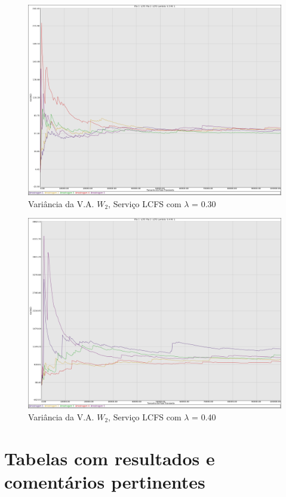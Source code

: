 \documentclass[a4paper,10pt]{article}
\begin{document}
\begin{figure}
	\caption{Variância da V.A. $W_2$, Serviço LCFS com $\lambda$ = 0.30}
	\label{figTransienteLCFSfila2VarWLambda030}
	\includegraphics[scale = 0.20]{./graficos_transiente_2/07.png}
\end{figure}

\begin{figure}
	\caption{Variância da V.A. $W_2$, Serviço LCFS com $\lambda$ = 0.40}
	\label{figTransienteLCFSfila2VarWLambda040}
	\includegraphics[scale = 0.20]{./graficos_transiente_2/08.png}
\end{figure}

\clearpage
\pagebreak

\section{Tabelas com resultados e comentários pertinentes}
\pagebreak
\end{document}
